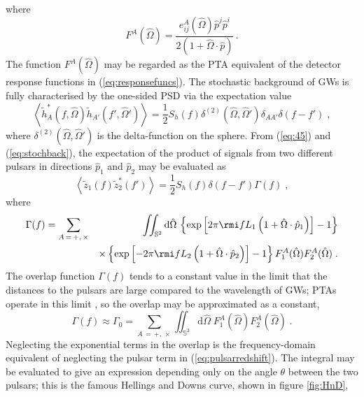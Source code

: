 where
\begin{equation}
F^{A}(\hat{\Omega}) = \frac{e_{ij}^{A}(\hat{\Omega})\hat{p}^{j}\hat{p}^{i}} {2\left(1+\hat{\Omega}\cdot\hat{p}\right)} \, .
\end{equation}
The function $F^{A}(\hat{\Omega})$ may be regarded as the PTA equivalent of the detector response functions in (\ref{eq:responsefuncs}). The stochastic background of GWs is fully characterised by the one-sided PSD via the expectation value
\begin{equation}\label{eq:stochback}
\left<\tilde{h}_{A}^{*}(f,\hat{\Omega})\tilde{h}_{A'}(f',\hat{\Omega}')\right> = \frac{1}{2}S_{h}(f)\delta^{(2)}(\hat{\Omega}, \hat{\Omega}')\delta_{AA'}\delta(f-f') \; ,
\end{equation}
where $\delta^{(2)}(\hat{\Omega},\hat{\Omega}')$ is the delta-function on the sphere. From (\ref{eq:45}) and (\ref{eq:stochback}), the expectation of the product of signals from two different pulsars in directions $\hat{p}_{1}$ and $\hat{p}_{2}$ may be evaluated as
\begin{equation} 
\left<\tilde{z}_{1}(f)\tilde{z}_{2}^{*}(f')\right> = \frac{1}{2}S_{h}(f)\delta (f-f')\Gamma(f) \; ,
\end{equation}
where
\begin{eqnarray}
\Gamma(f) &= \sum_{A\,=\,+,\,\times} & \iint_{{\mathbb{S}}^{2}}\mathrm{d}\hat{\Omega}\,\left\{\exp\left[2\pi\rmi fL_{1}\left(1+\hat{\Omega}\cdot\hat{p}_{1}\right)\right]-1\right\} \nonumber \\*
 & & \times \left\{\exp\left[-2\pi\rmi fL_{2}\left(1+\hat{\Omega}\cdot\hat{p}_{2}\right)\right]-1\right\} F_{1}^{A}(\hat{\Omega})F_{2}^{A}(\hat{\Omega}) \; .
\end{eqnarray}
The overlap function $\Gamma(f)$ tends to a constant value in the limit that the distances to the pulsars are large compared to the wavelength of GWs; PTAs operate in this limit \citep{Mingarelli2014}, so the overlap may be approximated as a constant, 
\begin{equation}
\Gamma(f) \approx \Gamma_{0} = \sum_{A\,=\,+,\,\times}\iint_{{\mathbb{S}}^{2}}\mathrm{d}\hat{\Omega}\;F_{1}^{A}(\hat{\Omega})F_{2}^{A}(\hat{\Omega})\;.
\end{equation}
Neglecting the exponential terms in the overlap is the frequency-domain equivalent of neglecting the pulsar term in (\ref{eq:pulsarredshift}). The integral may be evaluated to give an expression depending only on the angle $\theta$ between the two pulsars; this is the famous Hellings and Downs curve, shown in figure \ref{fig:HnD},

